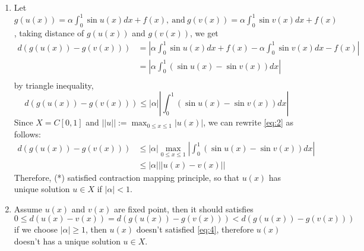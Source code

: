 \documentclass[a4paper,12pt]{article}
\theoremstyle{definition}
\begin{document}
	\begin{enumerate}
		\item 	Let $g(u(x)) = \alpha \int_{0}^{1} \sin u(x) dx + f(x),\ \text{and}\ g(v(x)) = \alpha \int_{0}^{1} \sin v(x) dx + f(x)$, taking distance of $g(u(x))$ and $g(v(x))$, we get
		\begin{equation}\label{eq:1}
		\begin{aligned}
		d(g(u(x)) - g(v(x))) &= \left| \alpha \int_{0}^{1} \sin u(x) dx + f(x) - \alpha \int_{0}^{1} \sin v(x) dx - f(x) \right|\\
		&= \left| \alpha \int_{0}^{1} (\sin u(x) - \sin v(x)) dx \right|\\
		\end{aligned}
		\end{equation}
		by triangle inequality,
		\begin{equation}\label{eq:2}
		d(g(u(x)) - g(v(x))) \leq \left| \alpha \right| \left| \int_{0}^{1} (\sin u(x) - \sin v(x)) dx \right|
		\end{equation}
		Since $X=C[0,1]$ and $\left|| u \right|| := \max_{0\leq x \leq 1} \left| u(x) \right|$, we can rewrite \eqref{eq:2} as follows:
		\begin{equation}\label{eq:3}
		\begin{aligned}
		d(g(u(x)) - g(v(x))) &\leq \left| \alpha \right| \max_{0\leq x \leq 1}\left| \int_{0}^{1} (\sin u(x) - \sin v(x)) dx \right|\\
		&\leq \left| \alpha \right| \left|| u(x) - v(x) \right||
		\end{aligned}
		\end{equation}
		Therefore, (*) satisfied contraction mapping principle, so that $u(x)$ has unique solution $u \in X$ if $\left| \alpha \right| < 1$.
		
		\item Assume $u(x)$ and $v(x)$ are fixed point, then it should satisfies
		\begin{equation}\label{eq:4}
		0 \leq d(u(x) - v(x)) = d(g(u(x)) - g(v(x))) < d(g(u(x)) - g(v(x)))
		\end{equation}
		if we choose $\left| \alpha \right| \geq 1$, then $u(x)$ doesn't satisfied \eqref{eq:4}, therefore $u(x)$ doesn't has a unique solution $u\in X$.
	\end{enumerate}
\end{document}
